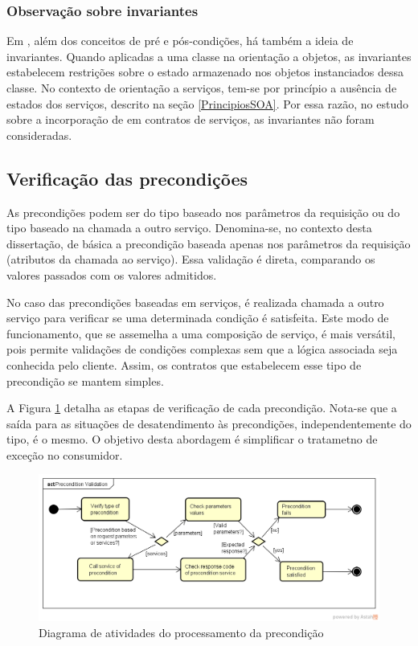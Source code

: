 \subsubsection{Observação sobre invariantes}
\vspace{-6mm}

Em \designbycontract{}, além dos conceitos de pré e pós-condições,
há também a ideia de invariantes\cite{meyer1997object}. Quando aplicadas a uma classe na
orientação a objetos, as invariantes estabelecem restrições sobre o estado
armazenado nos objetos instanciados dessa classe. No contexto de orientação a
serviços, tem-se por princípio a ausência de estados dos serviços, descrito na
seção \ref{PrincipiosSOA}. Por essa razão, no estudo sobre a incorporação de
\designbycontract{} em contratos de serviços, as invariantes não foram
consideradas.


\subsection{Verificação das precondições}
\vspace{-6mm}

As precondições podem ser do tipo baseado nos parâmetros da requisição ou do
tipo baseado na chamada a outro serviço. Denomina-se, no contexto desta
dissertação, de básica a precondição baseada apenas nos parâmetros da
requisição (atributos da chamada ao serviço). Essa validação é direta,
comparando os valores passados com os valores admitidos. 

No caso das precondições baseadas em serviços, é realizada chamada a outro
serviço para verificar se uma determinada condição é satisfeita. Este modo de
funcionamento, que se assemelha a uma composição de serviço, é mais versátil, pois permite
validações de condições complexas sem que a lógica associada seja conhecida pelo
cliente. Assim, os contratos que estabelecem esse tipo de
precondição se mantem simples.

A Figura \ref{FigServicePrecondition} detalha as etapas de verificação de cada
precondição. Nota-se que a saída para as situações de desatendimento às
precondições, independentemente do tipo, é o mesmo. O objetivo desta abordagem
é simplificar o tratametno de exceção no consumidor.

\begin{figure}[!htb]
\centering
\includegraphics[width=\textwidth,trim = 0mm 5mm 0mm
0mm,clip]{img/PreconditionValidation.png}
\caption{Diagrama de atividades do processamento da precondição}
\label{FigServicePrecondition}
\end{figure}



